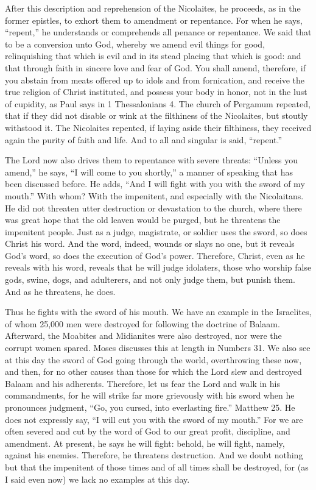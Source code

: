 After this description and reprehension of the Nicolaites, he proceeds, as in the former epistles, to exhort them to amendment or repentance. For when he says, “repent,” he understands or comprehends all penance or repentance. We said that to be a conversion unto God, whereby we amend evil things for good, relinquishing that which is evil and in its stead placing that which is good: and that through faith in sincere love and fear of God. You shall amend, therefore, if you abstain from meats offered up to idols and from fornication, and receive the true religion of Christ instituted, and possess your body in honor, not in the lust of cupidity, as Paul says in 1 Thessalonians 4. The church of Pergamum repeated, that if they did not disable or wink at the filthiness of the Nicolaites, but stoutly withstood it. The Nicolaites repented, if laying aside their filthiness, they received again the purity of faith and life. And to all and singular is said, “repent.”

The Lord now also drives them to repentance with severe threats: “Unless you amend,” he says, “I will come to you shortly,” a manner of speaking that has been discussed before. He adds, “And I will fight with you with the sword of my mouth.” With whom? With the impenitent, and especially with the Nicolaitans. He did not threaten utter destruction or devastation to the church, where there was great hope that the old leaven would be purged, but he threatens the impenitent people. Just as a judge, magistrate, or soldier uses the sword, so does Christ his word. And the word, indeed, wounds or slays no one, but it reveals God’s word, so does the execution of God’s power. Therefore, Christ, even as he reveals with his word, reveals that he will judge idolaters, those who worship false gods, swine, dogs, and adulterers, and not only judge them, but punish them. And as he threatens, he does.

Thus he fights with the sword of his mouth. We have an example in the Israelites, of whom 25,000 men were destroyed for following the doctrine of Balaam. Afterward, the Moabites and Midianites were also destroyed, nor were the corrupt women spared. Moses discusses this at length in Numbers 31. We also see at this day the sword of God going through the world, overthrowing these now, and then, for no other causes than those for which the Lord slew and destroyed Balaam and his adherents. Therefore, let us fear the Lord and walk in his commandments, for he will strike far more grievously with his sword when he pronounces judgment, “Go, you cursed, into everlasting fire.” Matthew 25. He does not expressly say, “I will cut you with the sword of my mouth.” For we are often severed and cut by the word of God to our great profit, discipline, and amendment. At present, he says he will fight: behold, he will fight, namely, against his enemies. Therefore, he threatens destruction. And we doubt nothing but that the impenitent of those times and of all times shall be destroyed, for (as I said even now) we lack no examples at this day.


